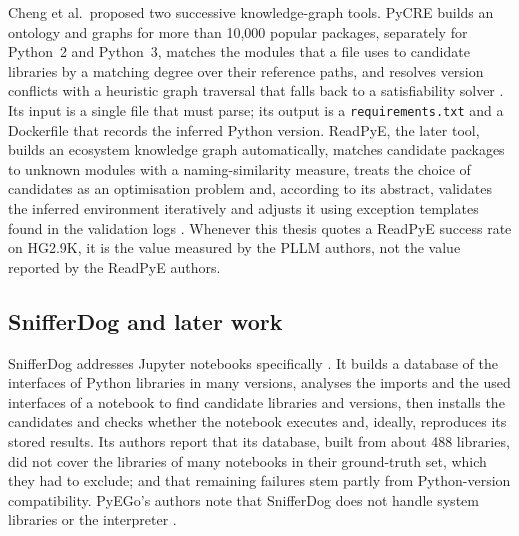 Cheng et al.\ proposed two successive knowledge-graph tools. PyCRE builds an ontology and graphs for more than 10{,}000 popular packages, separately for Python~2 and Python~3, matches the modules that a file uses to candidate libraries by a matching degree over their reference paths, and resolves version conflicts with a heuristic graph traversal that falls back to a satisfiability solver \cite{cheng2022pycre}. Its input is a single file that must parse; its output is a \texttt{requirements.txt} and a Dockerfile that records the inferred Python version. ReadPyE, the later tool, builds an ecosystem knowledge graph automatically, matches candidate packages to unknown modules with a naming-similarity measure, treats the choice of candidates as an optimisation problem and, according to its abstract, validates the inferred environment iteratively and adjusts it using exception templates found in the validation logs \cite{cheng2024revisiting}.%
Whenever this thesis quotes a ReadPyE success rate on HG2.9K, it is the value measured by the PLLM authors, not the value reported by the ReadPyE authors.

\subsection{SnifferDog and later work}

SnifferDog addresses Jupyter notebooks specifically \cite{wang2021sniffer}. It builds a database of the interfaces of Python libraries in many versions, analyses the imports and the used interfaces of a notebook to find candidate libraries and versions, then installs the candidates and checks whether the notebook executes and, ideally, reproduces its stored results. Its authors report that its database, built from about 488 libraries, did not cover the libraries of many notebooks in their ground-truth set, which they had to exclude; and that remaining failures stem partly from Python-version compatibility. PyEGo's authors note that SnifferDog does not handle system libraries or the interpreter \cite{ye2022pyego}.%

